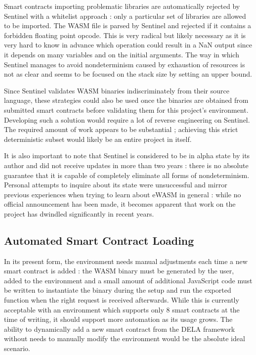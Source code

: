 \documentclass[11pt, a4paper, twoside, openright]{article}
\begin{document}
Smart contracts importing problematic libraries are automatically rejected by Sentinel with a whitelist approach : only a particular set of libraries are allowed to be imported. The WASM file is parsed by Sentinel and rejected if it contains a forbidden floating point opcode. This is very radical but likely necessary as it is very hard to know in advance which operation could result in a NaN output since it depends on many variables and on the initial arguments. The way in which Sentinel manages to avoid nondeterminism caused by exhaustion of resources is not as clear and seems to be focused on the stack size by setting an upper bound.

Since Sentinel validates WASM binaries indiscriminately from their source language, these strategies could also be used once the binaries are obtained from submitted smart contracts before validating them for this project's environment. Developing such a solution would require a lot of reverse engineering on Sentinel. The required amount of work appears to be substantial ; achieving this strict deterministic subset would likely be an entire project in itself. 

It is also important to note that Sentinel is considered to be in alpha state by its author and did not receive updates in more than two years : there is no absolute guarantee that it is capable of completely eliminate all forms of nondeterminism. Personal attempts to inquire about its state were unsuccessful and mirror previous experiences when trying to learn about eWASM in general : while no official announcement has been made, it becomes apparent that work on the project has dwindled significantly in recent years.

\subsection{Automated Smart Contract Loading}

In its present form, the environment needs manual adjustments each time a new smart contract is added : the WASM binary must be generated by the user, added to the environment and a small amount of additional JavaScript code must be written to instantiate the binary during the setup and run the exported function when the right request is received afterwards. While this is currently acceptable with an environment which supports only 8 smart contracts at the time of writing, it should support more automation as its usage grows. The ability to dynamically add a new smart contract from the DELA framework without needs to manually modify the environment would be the absolute ideal scenario.
\end{document}
